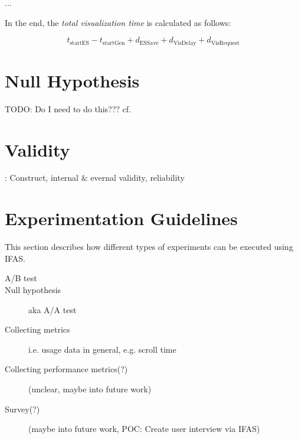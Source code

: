 ...

In the end, the \emph{total visualization time} is calculated as follows:

$$t_\text{startES} - t_\text{startGen}+ d_\text{ESSave} + d_\text{VisDelay} + d_\text{VisRequest}$$


\section{Null Hypothesis}

TODO: Do I need to do this??? cf. \cite{Kohavi2009}

\section{Validity}
\label{sec:evaluation:validity}

\cite{Easterbrook2008a}: Construct, internal \& evernal validity, reliability

\section{Experimentation Guidelines}

This section describes how different types of experiments can be executed using \ac{IFAS}.

\begin{description}
\item[A/B test]
\item[Null hypothesis] aka A/A test \cite{Kohavi2009}
\item[Collecting metrics] i.e. usage data in general, e.g. scroll time
\item[Collecting performance metrics(?)] (unclear, maybe into future work)
\item[Survey(?)] (maybe into future work, POC: Create user interview via \ac{IFAS})
\end{description}

